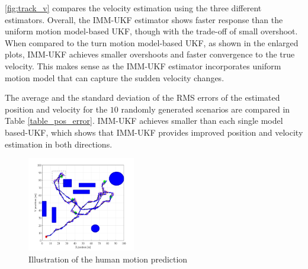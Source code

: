 \documentclass[journal]{IEEEtran}
\begin{document}
\cref{fig:track_v} compares the velocity estimation using the three different estimators.
	Overall, the IMM-UKF estimator shows faster response than the uniform motion model-based UKF, though with the trade-off of small overshoot.
	When compared to the turn motion model-based UKF, as shown in the enlarged plots, IMM-UKF achieves smaller overshoots and faster convergence to the true velocity.
	This makes sense as the IMM-UKF estimator incorporates uniform motion model that can capture the sudden velocity changes.
    
The average and the standard deviation of the RMS errors of the estimated position and velocity for the $10$ randomly generated scenarios are compared in Table \ref{table_pos_error}.
IMM-UKF achieves smaller than each single model based-UKF, which shows that IMM-UKF provides improved position and velocity estimation in both directions.
   	\begin{figure}
		\centering
		\includegraphics[width=0.42\textwidth]{figures/Human_motion_prediction3}
        \caption{Illustration of the human motion prediction}
		\label{fig:prediction}
	\end{figure}   

    
\end{document}
